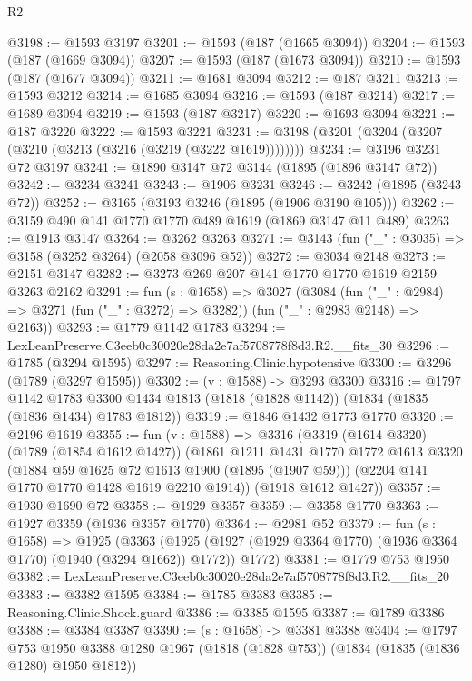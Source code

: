 \begin{lexlean}{R2}
\begin{coremodule}
@3198 := @1593 @3197
@3201 := @1593 (@187 (@1665 @3094))
@3204 := @1593 (@187 (@1669 @3094))
@3207 := @1593 (@187 (@1673 @3094))
@3210 := @1593 (@187 (@1677 @3094))
@3211 := @1681 @3094
@3212 := @187 @3211
@3213 := @1593 @3212
@3214 := @1685 @3094
@3216 := @1593 (@187 @3214)
@3217 := @1689 @3094
@3219 := @1593 (@187 @3217)
@3220 := @1693 @3094
@3221 := @187 @3220
@3222 := @1593 @3221
@3231 := @3198 (@3201 (@3204 (@3207 (@3210 (@3213 (@3216 (@3219 (@3222 @1619))))))))
@3234 := @3196 @3231 @72 @3197
@3241 := @1890 @3147 @72 @3144 (@1895 (@1896 @3147 @72))
@3242 := @3234 @3241
@3243 := @1906 @3231
@3246 := @3242 (@1895 (@3243 @72))
@3252 := @3165 (@3193 @3246 (@1895 (@1906 @3190 @105)))
@3262 := @3159 @490 @141 @1770 @1770 @489 @1619 (@1869 @3147 @11 @489)
@3263 := @1913 @3147
@3264 := @3262 @3263
@3271 := @3143 (fun ("_" : @3035) => @3158 (@3252 @3264) (@2058 @3096 @52))
@3272 := @3034 @2148
@3273 := @2151 @3147
@3282 := @3273 @269 @207 @141 @1770 @1770 @1619 @2159 @3263 @2162
@3291 := fun (s : @1658) =>
  @3027
    (@3084
      (fun ("_" : @2984) => @3271 (fun ("_" : @3272) => @3282))
      (fun ("_" : @2983 @2148) => @2163))
@3293 := @1779 @1142 @1783
@3294 := LexLeanPreserve.C3eeb0c30020e28da2e7af5708778f8d3.R2.__fits_30
@3296 := @1785 (@3294 @1595)
@3297 := Reasoning.Clinic.hypotensive
@3300 := @3296 (@1789 (@3297 @1595))
@3302 := (v : @1588) -> @3293 @3300
@3316 := @1797
    @1142
    @1783
    @3300
    @1434
    @1813
    (@1818 (@1828 @1142))
    (@1834 (@1835 (@1836 @1434) @1783 @1812))
@3319 := @1846 @1432 @1773 @1770
@3320 := @2196 @1619
@3355 := fun (v : @1588) =>
  @3316
    (@3319
      (@1614 @3320)
      (@1789 (@1854 @1612 @1427))
      (@1861
        @1211
        @1431
        @1770
        @1772
        @1613
        @3320
        (@1884 @59 @1625 @72 @1613 @1900 (@1895 (@1907 @59)))
        (@2204 @141 @1770 @1770 @1428 @1619 @2210 @1914))
      (@1918 @1612 @1427))
@3357 := @1930 @1690 @72
@3358 := @1929 @3357
@3359 := @3358 @1770
@3363 := @1927 @3359 (@1936 @3357 @1770)
@3364 := @2981 @52
@3379 := fun (s : @1658) =>
  @1925
    (@3363
      (@1925 (@1927 (@1929 @3364 @1770) (@1936 @3364 @1770) (@1940 (@3294 @1662)) @1772))
      @1772)
@3381 := @1779 @753 @1950
@3382 := LexLeanPreserve.C3eeb0c30020e28da2e7af5708778f8d3.R2.__fits_20
@3383 := @3382 @1595
@3384 := @1785 @3383
@3385 := Reasoning.Clinic.Shock.guard
@3386 := @3385 @1595
@3387 := @1789 @3386
@3388 := @3384 @3387
@3390 := (s : @1658) -> @3381 @3388
@3404 := @1797
    @753
    @1950
    @3388
    @1280
    @1967
    (@1818 (@1828 @753))
    (@1834 (@1835 (@1836 @1280) @1950 @1812))

\end{coremodule}
\end{lexlean}
